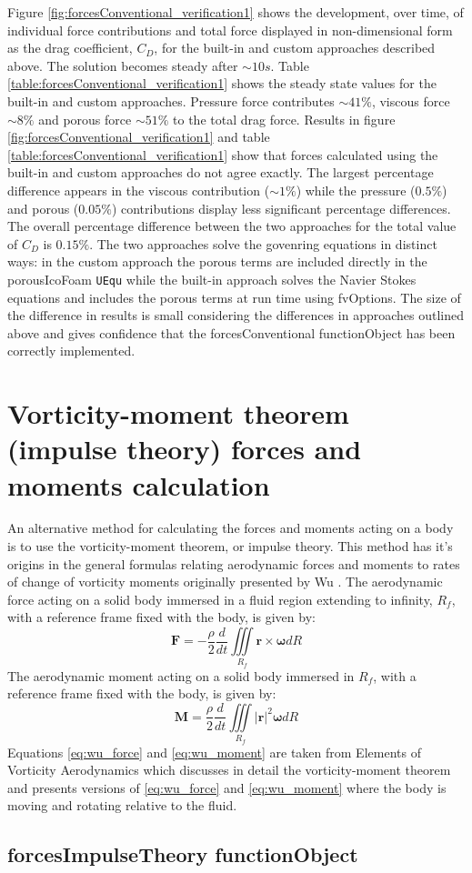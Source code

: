 \documentclass[a4paper,11pt]{report}
\begin{document}
Figure \ref{fig:forcesConventional_verification1} shows the development, over time, of individual force contributions and total force displayed in non-dimensional form as the drag coefficient, $C_D$, for the built-in and custom approaches described above. The solution becomes steady after $\sim10s$. Table \ref{table:forcesConventional_verification1} shows the steady state values for the built-in and custom approaches. Pressure force contributes $\sim 41\%$, viscous force $\sim 8\%$ and porous force $\sim 51\%$ to the total drag force. Results in figure \ref{fig:forcesConventional_verification1} and table \ref{table:forcesConventional_verification1} show that forces calculated using the built-in and custom approaches do not agree exactly. The largest percentage difference appears in the viscous contribution ($\sim 1\%$) while the pressure ($0.5\%$) and porous ($0.05\%$) contributions display less significant percentage differences. The overall percentage difference between the two approaches for the total value of $C_D$ is $0.15 \%$. The two approaches solve the govenring equations in distinct ways: in the custom approach the porous terms are included directly in the porousIcoFoam \texttt{UEqu} while the built-in approach solves the Navier Stokes equations and includes the porous terms at run time using fvOptions. The size of the difference in results is small considering the differences in approaches outlined above and gives confidence that the forcesConventional functionObject has been correctly implemented.

\section{Vorticity-moment theorem (impulse theory) forces and moments calculation}
An alternative method for calculating the forces and moments acting on a body is to use the vorticity-moment theorem, or impulse theory. This method has it's origins in the general formulas relating aerodynamic forces and moments to rates of change of vorticity moments originally presented by Wu \cite{Wu1981}. The aerodynamic force acting on a solid body immersed in a fluid region extending to infinity, $R_{f}$, with a reference frame fixed with the body, is given by:
\begin{equation}
    \mathbf{F} = - \frac{\rho}{2}\frac{d}{dt} \iiint\limits_{R_{f}} \mathbf{r}\times\pmb{\omega} dR
    \label{eq:wu_force}
\end{equation}
The aerodynamic moment acting on a solid body immersed in $R_{f}$, with a reference frame fixed with the body, is given by:
\begin{equation}
    \mathbf{M} = \frac{\rho}{2}\frac{d}{dt} \iiint\limits_{R_{f}} \lvert\mathbf{r}\rvert^2\pmb{\omega} dR
    \label{eq:wu_moment}
\end{equation}
Equations \ref{eq:wu_force} and \ref{eq:wu_moment} are taken from Elements of Vorticity Aerodynamics \cite{Wu2018} which discusses in detail the vorticity-moment theorem and presents versions of \ref{eq:wu_force} and \ref{eq:wu_moment} where the body is moving and rotating relative to the fluid.
\subsection{forcesImpulseTheory functionObject}


\end{document}
